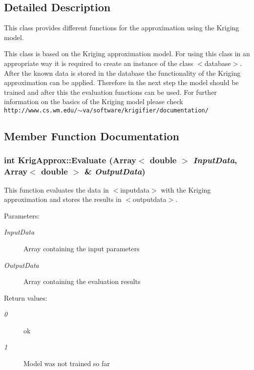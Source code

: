 \subsection{Detailed Description}
This class provides different functions for the approximation using the Kriging model. 

This class is based on the Kriging approximation model. For using this class in an appropriate way it is required to create an instance of the class $<$database$>$. After the known data is stored in the database the functionality of the Kriging approximation can be applied. Therefore in the next step the model should be trained and after this the evaluation functions can be used. For further information on the basics of the Kriging model please check {\tt http://www.cs.wm.edu/$\sim$va/software/krigifier/documentation/} 



\subsection{Member Function Documentation}
\subsubsection{\setlength{\rightskip}{0pt plus 5cm}int Krig\-Approx::Evaluate (Array$<$ double $>$ {\em Input\-Data}, Array$<$ double $>$ \& {\em Output\-Data})}\label{classKrigApprox_a7}


This function evaluates the data in $<$inputdata$>$ with the Kriging approximation and stores the results in $<$outputdata$>$. 

\begin{Desc}
\item[Parameters:]
\begin{description}
\item[{\em Input\-Data}]Array containing the input parameters \item[{\em Output\-Data}]Array containing the evaluation results \end{description}
\end{Desc}
\begin{Desc}
\item[Return values:]
\begin{description}
\item[{\em 0}]ok \item[{\em 1}]Model was not trained so far \end{description}
\end{Desc}
